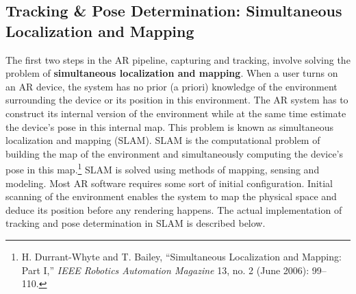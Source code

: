\begin{figure}[!ht]
\end{figure}

\begin{figure}[!ht]
\end{figure}

\subsection{Tracking \& Pose Determination: Simultaneous Localization and Mapping}
The first two steps in the AR pipeline, capturing and tracking, involve solving the problem of \textbf{simultaneous localization and mapping}. When a user turns on an AR device, the system has no prior (a priori) knowledge of the environment surrounding the device or its position in this environment. The AR system has to construct its internal version of the environment while at the same time estimate the device's pose in this internal map. This problem is known as simultaneous localization and mapping (SLAM). SLAM is the computational problem of building the map of the environment and simultaneously computing the device’s pose in this map.\footnote{H. Durrant-Whyte and T. Bailey, “Simultaneous Localization and Mapping: Part I,” \textit{IEEE Robotics Automation Magazine} 13, no. 2 (June 2006): 99–110.} SLAM is solved using methods of mapping, sensing and modeling. Most AR software requires some sort of initial configuration. Initial scanning of the environment enables the system to map the physical space and deduce its position before any rendering happens. The actual implementation of tracking and pose determination in SLAM is described below.

